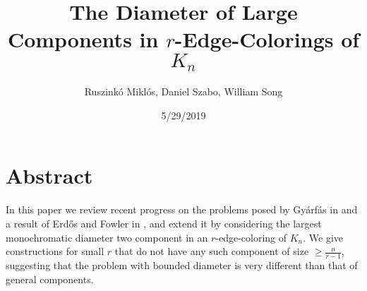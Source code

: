 \documentclass{article}
\title{The Diameter of Large Components in $ r $-Edge-Colorings of $ K_n $}
\author{Ruszink\'{o} Mikl\'{o}s, Daniel Szabo, William Song}
\date{5/29/2019}
\begin{document}
	\maketitle
	\section*{Abstract}
	In this paper we review recent progress on the problems posed by Gy\'{a}rf\'{a}s in \cite{Gy2} and a result of Erd\H os and Fowler in \cite{EF}, and extend it by considering the largest monochromatic diameter two component in an $ r $-edge-coloring of $ K_n $. We give constructions for small $ r $ that do not have any such component of size $ \geq \frac{n}{r-1} $, suggesting that the problem with bounded diameter is very different than that of general components.
	
	
\end{document}
